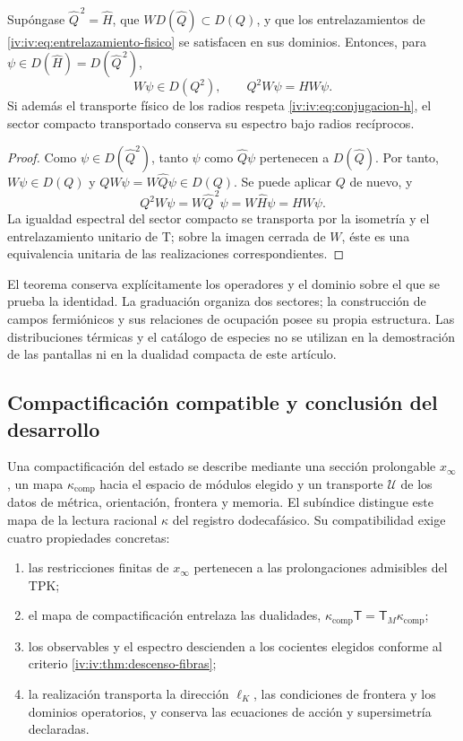 \begin{theorem}
\label{iv:iv:thm:supercarga-transporte}
Supóngase \(\widehat Q^{\,2}=\widehat H\), que
\(W D(\widehat Q)\subset D(Q)\), y que los
entrelazamientos de \eqref{iv:iv:eq:entrelazamiento-fisico}
se satisfacen en sus dominios. Entonces, para
\(\psi\in D(\widehat H)=D(\widehat Q^{\,2})\),
\[
 W\psi\in D(Q^2),\qquad Q^2W\psi=HW\psi.
\]
Si además el transporte físico de los radios respeta
\eqref{iv:iv:eq:conjugacion-h}, el sector compacto
transportado conserva su espectro bajo radios recíprocos.
\end{theorem}
\begin{proof}
Como \(\psi\in D(\widehat Q^2)\), tanto
\(\psi\) como \(\widehat Q\psi\) pertenecen
a \(D(\widehat Q)\). Por tanto, \(W\psi\in D(Q)\)
y \(QW\psi=W\widehat Q\psi\in D(Q)\). Se puede
aplicar \(Q\) de nuevo, y
\[
 Q^2W\psi=W\widehat Q^{\,2}\psi
          =W\widehat H\psi=HW\psi.
\]
La igualdad espectral del sector compacto se transporta
por la isometría y el entrelazamiento unitario de T;
sobre la imagen cerrada de \(W\), éste es una
equivalencia unitaria de las realizaciones correspondientes.
\end{proof}

El teorema conserva explícitamente los operadores y el
dominio sobre el que se prueba la identidad. La
graduación organiza dos sectores; la construcción de
campos fermiónicos y sus relaciones de ocupación posee
su propia estructura. Las distribuciones térmicas y el
catálogo de especies no se utilizan en la demostración
de las pantallas ni en la dualidad compacta de este
artículo.

\subsection{Compactificación compatible y conclusión del desarrollo}

Una compactificación del estado se describe mediante
una sección prolongable \(x_\infty\), un mapa
\(\kappa_{\mathrm{comp}}\) hacia el espacio de módulos
elegido y un transporte \(\mathcal U\) de los datos
de métrica, orientación, frontera y memoria. El
subíndice distingue este mapa de la lectura racional
\(\kappa\) del registro dodecafásico. Su compatibilidad
exige cuatro propiedades concretas:
\begin{enumerate}
\item las restricciones finitas de \(x_\infty\)
      pertenecen a las prolongaciones admisibles del TPK;
\item el mapa de compactificación entrelaza las dualidades,
      \(\kappa_{\mathrm{comp}}\mathsf T
        =\mathsf T_M\kappa_{\mathrm{comp}}\);
\item los observables y el espectro descienden a los
      cocientes elegidos conforme al criterio
      \ref{iv:iv:thm:descenso-fibras};
\item la realización transporta la dirección
      \(\ell_K\), las condiciones de frontera y los
      dominios operatorios, y conserva las ecuaciones
      de acción y supersimetría declaradas.
\end{enumerate}

